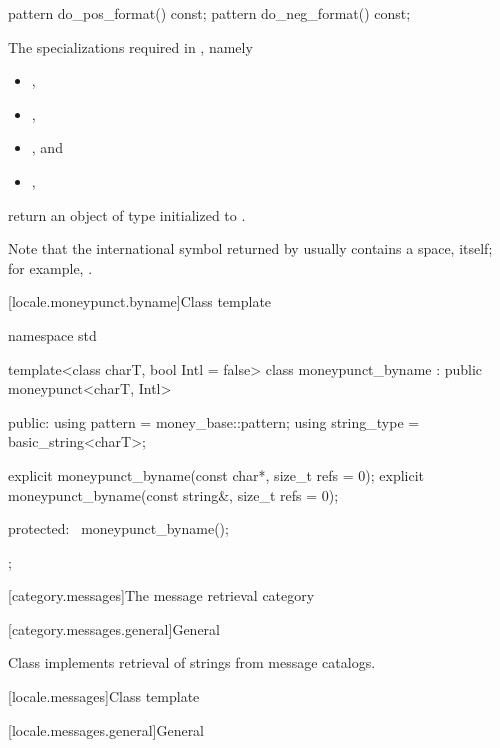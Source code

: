 %
%
\begin{itemdecl}
pattern do_pos_format() const;
pattern do_neg_format() const;
\end{itemdecl}

\begin{itemdescr}
\pnum
\returns
The specializations required in , namely
\begin{itemize}
\item {},
\item {},
\item {}, and
\item {},
\end{itemize}
return an object of type 
initialized to .
\begin{footnote}
Note that the international symbol returned by 
usually contains a space, itself;
for example, .
\end{footnote}
\end{itemdescr}

[locale.moneypunct.byname]{Class template }

%
\begin{codeblock}
namespace std {
  template<class charT, bool Intl = false>
  class moneypunct_byname : public moneypunct<charT, Intl> {
    public:
      using pattern     = money_base::pattern;
      using string_type = basic_string<charT>;

      explicit moneypunct_byname(const char*, size_t refs = 0);
      explicit moneypunct_byname(const string&, size_t refs = 0);

    protected:
      ~moneypunct_byname();
    };
}
\end{codeblock}

[category.messages]{The message retrieval category}

[category.messages.general]{General}

\pnum
Class 
implements retrieval of strings from message catalogs.

[locale.messages]{Class template }

[locale.messages.general]{General}

